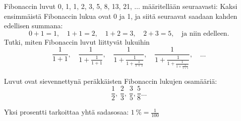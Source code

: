 \begin{tehtava}
Fibonaccin luvut 0, 1, 1, 2, 3, 5, 8, 13, 21, $\ldots$ määritellään seuraavasti: Kaksi ensimmäistä
Fibonaccin lukua ovat 0 ja 1, ja siitä seuraavat saadaan kahden
edellisen summana: 
\[ 0+1=1, \quad 1+1=2, \quad 1+2 = 3, \quad 2+3=5, \quad 
\textrm{ja niin edelleen.} \]
Tutki, miten Fibonaccin luvut liittyvät lukuihin
\[ \frac{1}{1+1}, \quad \frac{1}{1+\frac{1}{1+1}}, \quad
\frac{1}{1+\frac{1}{1+\frac{1}{1+1}}}, \quad 
\frac{1}{1+\frac{1}{1+\frac{1}{1+\frac{1}{1+1}}}}, \quad \ldots\]
\begin{vastaus}
Luvut ovat sievennettynä peräkkäisten Fibonaccin
lukujen osamääriä:
\[\frac{1}{2}, \ \frac{2}{3}, \ \frac{3}{5}, \frac{5}{8} \ldots  \]
\end{vastaus}
\end{tehtava}

    Yksi prosentti tarkoittaa yhtä sadasosaa: $1~\% = \frac{1}{100}$
    
